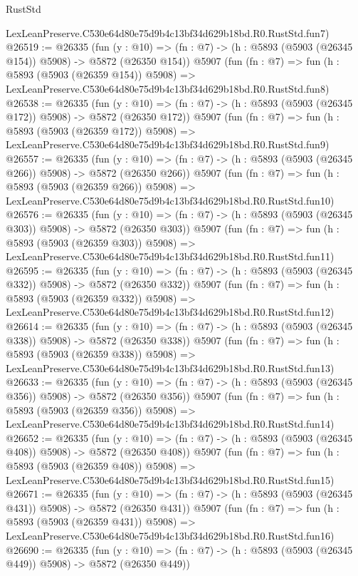 \begin{lexlean}{RustStd}
\begin{coremodule}
    LexLeanPreserve.C530e64d80e75d9b4c13bf34d629b18bd.R0.RustStd.fun7)
@26519 := @26335
    (fun (y : @10) => (fn : @7) -> (h : @5893 (@5903 (@26345 @154)) @5908) -> @5872 (@26350 @154))
    @5907
    (fun (fn : @7) =>
    fun (h : @5893 (@5903 (@26359 @154)) @5908) =>
    LexLeanPreserve.C530e64d80e75d9b4c13bf34d629b18bd.R0.RustStd.fun8)
@26538 := @26335
    (fun (y : @10) => (fn : @7) -> (h : @5893 (@5903 (@26345 @172)) @5908) -> @5872 (@26350 @172))
    @5907
    (fun (fn : @7) =>
    fun (h : @5893 (@5903 (@26359 @172)) @5908) =>
    LexLeanPreserve.C530e64d80e75d9b4c13bf34d629b18bd.R0.RustStd.fun9)
@26557 := @26335
    (fun (y : @10) => (fn : @7) -> (h : @5893 (@5903 (@26345 @266)) @5908) -> @5872 (@26350 @266))
    @5907
    (fun (fn : @7) =>
    fun (h : @5893 (@5903 (@26359 @266)) @5908) =>
    LexLeanPreserve.C530e64d80e75d9b4c13bf34d629b18bd.R0.RustStd.fun10)
@26576 := @26335
    (fun (y : @10) => (fn : @7) -> (h : @5893 (@5903 (@26345 @303)) @5908) -> @5872 (@26350 @303))
    @5907
    (fun (fn : @7) =>
    fun (h : @5893 (@5903 (@26359 @303)) @5908) =>
    LexLeanPreserve.C530e64d80e75d9b4c13bf34d629b18bd.R0.RustStd.fun11)
@26595 := @26335
    (fun (y : @10) => (fn : @7) -> (h : @5893 (@5903 (@26345 @332)) @5908) -> @5872 (@26350 @332))
    @5907
    (fun (fn : @7) =>
    fun (h : @5893 (@5903 (@26359 @332)) @5908) =>
    LexLeanPreserve.C530e64d80e75d9b4c13bf34d629b18bd.R0.RustStd.fun12)
@26614 := @26335
    (fun (y : @10) => (fn : @7) -> (h : @5893 (@5903 (@26345 @338)) @5908) -> @5872 (@26350 @338))
    @5907
    (fun (fn : @7) =>
    fun (h : @5893 (@5903 (@26359 @338)) @5908) =>
    LexLeanPreserve.C530e64d80e75d9b4c13bf34d629b18bd.R0.RustStd.fun13)
@26633 := @26335
    (fun (y : @10) => (fn : @7) -> (h : @5893 (@5903 (@26345 @356)) @5908) -> @5872 (@26350 @356))
    @5907
    (fun (fn : @7) =>
    fun (h : @5893 (@5903 (@26359 @356)) @5908) =>
    LexLeanPreserve.C530e64d80e75d9b4c13bf34d629b18bd.R0.RustStd.fun14)
@26652 := @26335
    (fun (y : @10) => (fn : @7) -> (h : @5893 (@5903 (@26345 @408)) @5908) -> @5872 (@26350 @408))
    @5907
    (fun (fn : @7) =>
    fun (h : @5893 (@5903 (@26359 @408)) @5908) =>
    LexLeanPreserve.C530e64d80e75d9b4c13bf34d629b18bd.R0.RustStd.fun15)
@26671 := @26335
    (fun (y : @10) => (fn : @7) -> (h : @5893 (@5903 (@26345 @431)) @5908) -> @5872 (@26350 @431))
    @5907
    (fun (fn : @7) =>
    fun (h : @5893 (@5903 (@26359 @431)) @5908) =>
    LexLeanPreserve.C530e64d80e75d9b4c13bf34d629b18bd.R0.RustStd.fun16)
@26690 := @26335
    (fun (y : @10) => (fn : @7) -> (h : @5893 (@5903 (@26345 @449)) @5908) -> @5872 (@26350 @449))

\end{coremodule}
\end{lexlean}
